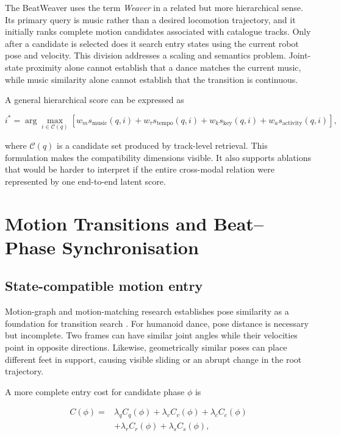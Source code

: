 The BeatWeaver uses the term \emph{Weaver} in a related but more
hierarchical sense. Its primary query is music rather than a desired locomotion
trajectory, and it initially ranks complete motion candidates associated with
catalogue tracks. Only after a candidate is selected does it search entry
states using the current robot pose and velocity. This division addresses a
scaling and semantics problem. Joint-state proximity alone cannot establish
that a dance matches the current music, while music similarity alone cannot
establish that the transition is continuous.

A general hierarchical score can be expressed as

\begin{equation}
    i^{*}
    = \arg\max_{i \in \mathcal{C}(q)}
      \left[
        w_m s_{\mathrm{music}}(q,i)
        + w_{\tau}s_{\mathrm{tempo}}(q,i)
        + w_k s_{\mathrm{key}}(q,i)
        + w_a s_{\mathrm{activity}}(q,i)
      \right],
\end{equation}

where $\mathcal{C}(q)$ is a candidate set produced by track-level retrieval.
This formulation makes the compatibility dimensions visible. It also supports
ablations that would be harder to interpret if the entire cross-modal relation
were represented by one end-to-end latent score.


\section{Motion Transitions and Beat--Phase Synchronisation}
\label{sec:lit_transitions_phase}

\subsection{State-compatible motion entry}
\label{subsec:lit_state_entry}

Motion-graph and motion-matching research establishes pose similarity as a
foundation for transition search \cite{kovar2023motion,holden2020learned}.
For humanoid dance, pose distance is necessary but incomplete. Two frames can
have similar joint angles while their velocities point in opposite directions.
Likewise, geometrically similar poses can place different feet in support,
causing visible sliding or an abrupt change in the root trajectory.

A more complete entry cost for candidate phase $\phi$ is

\begin{equation}
\begin{split}
    C(\phi) ={}&
      \lambda_q C_q(\phi)
      + \lambda_v C_v(\phi)
      + \lambda_c C_c(\phi) \\
      &+ \lambda_r C_r(\phi)
      + \lambda_s C_s(\phi),
\end{split}
\end{equation}

